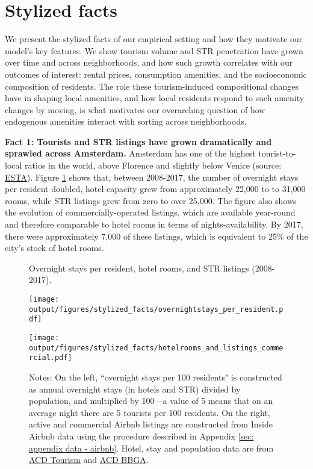 \documentclass[11pt]{article}
\newcommand{\Paragraph}{\vspace{0.1cm}\noindent\textbf}
\begin{document}
\section{Stylized facts}\label{sec: stylized facts}

We present the stylized facts of our empirical setting and how they motivate our model's key features. We show tourism volume and STR penetration have grown over time and across neighborhoods, and how such growth correlates with our outcomes of interest: rental prices, consumption amenities, and the socioeconomic composition of residents. The role these tourism-induced compositional changes have in shaping local amenities, and how local residents respond to such amenity changes by moving, is what motivates our overarching question of how endogenous amenities interact with sorting across neighborhoods.

\Paragraph{Fact 1: Tourists and STR listings have grown dramatically and sprawled across Amsterdam.} Amsterdam has one of the highest tourist-to-local ratios in the world, above Florence and slightly below Venice (source: \href{https://www.official-esta.com/information/reports/cities-with-most-tourists}{ESTA}). Figure \ref{fig:tourism and airbnb} shows that, between 2008-2017, the number of overnight stays per resident doubled, hotel capacity grew from approximately 22,000 to to 31,000 rooms, while STR listings grew from zero to over 25,000. The figure also shows the evolution of commercially-operated listings, which are available year-round and therefore comparable to hotel rooms in terms of nights-availability. By 2017, there were approximately 7,000 of these listings, which is equivalent to 25\% of the city's stock of hotel rooms.

\begin{figure}[H]
    \caption{Overnight stays per resident, hotel rooms, and STR listings (2008-2017).}
     \label{fig:tourism and airbnb}
    \centering
    \begin{minipage}{0.5\textwidth}
        \texttt{[image: output/figures/stylized\_facts/overnightstays\_per\_resident.pdf]}
    \end{minipage}%
    \begin{minipage}{0.5\textwidth}
        \texttt{[image: output/figures/stylized\_facts/hotelrooms\_and\_listings\_commercial.pdf]}
    \end{minipage}
    \caption*{\footnotesize Notes: On the left, ``overnight stays per 100 residents" is constructed as annual overnight stays (in hotels and STR) divided by population, and multiplied by 100---a value of 5 means that on an average night there are 5 tourists per 100 residents. On the right, active and commercial Airbnb listings are constructed from Inside Airbnb data using the procedure described in Appendix \ref{sec: appendix data - airbnb}. Hotel, stay and population data are from \href{https://onderzoek.amsterdam.nl/dossier/toerisme?term=toerisme}{ACD Tourism} and \href{https://data.amsterdam.nl/datasets/rl6-35tFAw2Ljw/basisbestand-gebieden-amsterdam-bbga/}{ACD BBGA}.}
\end{figure}
\end{document}
